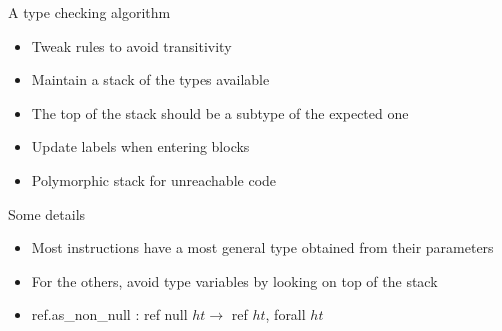\documentclass{beamer}
\begin{document}
\begin{frame}{A type checking algorithm}
  \begin{itemize}
    \item Tweak rules to avoid transitivity\pause
    \item Maintain a stack of the types available\pause
    \item The top of the stack should be a subtype of the expected one\pause
    \item Update labels when entering blocks\pause
    \item Polymorphic stack for unreachable code
  \end{itemize}
\end{frame}

\begin{frame}{Some details}
  \begin{itemize}
    \item Most instructions have a most general type obtained from their
      parameters\pause
    \item For the others, avoid type variables by looking on top of the
      stack\pause
    \item ref.as\_non\_null : ref null $ht\to$ ref $ht$, forall $ht$
  \end{itemize}
\end{frame}
\end{document}
